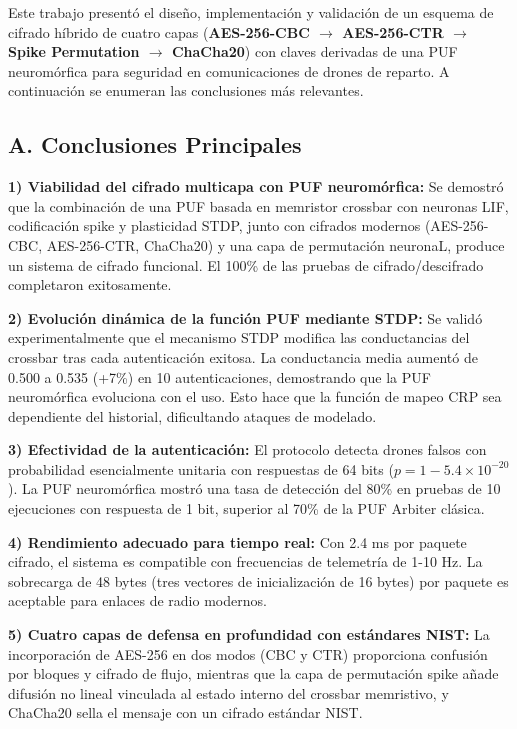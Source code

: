 Este trabajo presentó el diseño, implementación y validación de un esquema de cifrado híbrido de cuatro capas (\textbf{AES-256-CBC $\to$ AES-256-CTR $\to$ Spike Permutation $\to$ ChaCha20}) con claves derivadas de una PUF neuromórfica para seguridad en comunicaciones de drones de reparto. A continuación se enumeran las conclusiones más relevantes.

\subsection*{A. Conclusiones Principales}

\textbf{1) Viabilidad del cifrado multicapa con PUF neuromórfica:} Se demostró que la combinación de una PUF basada en memristor crossbar con neuronas LIF, codificación spike y plasticidad STDP, junto con cifrados modernos (AES-256-CBC, AES-256-CTR, ChaCha20) y una capa de permutación neuronaL, produce un sistema de cifrado funcional. El 100\% de las pruebas de cifrado/descifrado completaron exitosamente.

\textbf{2) Evolución dinámica de la función PUF mediante STDP:} Se validó experimentalmente que el mecanismo STDP modifica las conductancias del crossbar tras cada autenticación exitosa. La conductancia media aumentó de 0.500 a 0.535 (+7\%) en 10 autenticaciones, demostrando que la PUF neuromórfica evoluciona con el uso. Esto hace que la función de mapeo CRP sea dependiente del historial, dificultando ataques de modelado.

\textbf{3) Efectividad de la autenticación:} El protocolo detecta drones falsos con probabilidad esencialmente unitaria con respuestas de 64 bits ($p = 1 - 5.4 \times 10^{-20}$). La PUF neuromórfica mostró una tasa de detección del 80\% en pruebas de 10 ejecuciones con respuesta de 1 bit, superior al 70\% de la PUF Arbiter clásica.

\textbf{4) Rendimiento adecuado para tiempo real:} Con 2.4 ms por paquete cifrado, el sistema es compatible con frecuencias de telemetría de 1-10 Hz. La sobrecarga de 48 bytes (tres vectores de inicialización de 16 bytes) por paquete es aceptable para enlaces de radio modernos.

\textbf{5) Cuatro capas de defensa en profundidad con estándares NIST:} La incorporación de AES-256 en dos modos (CBC y CTR) proporciona confusión por bloques y cifrado de flujo, mientras que la capa de permutación spike añade difusión no lineal vinculada al estado interno del crossbar memristivo, y ChaCha20 sella el mensaje con un cifrado estándar NIST.

